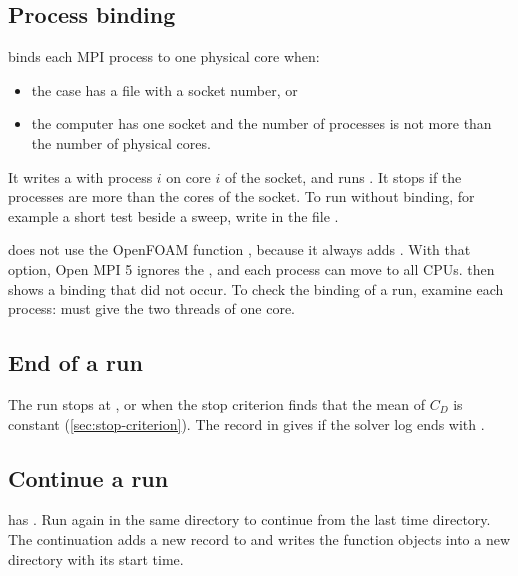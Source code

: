 \subsection{Process binding}\label{sec:binding}

 binds each MPI process to one physical core when:
\begin{itemize}
\item the case has a file  with a socket number, or
\item the computer has one socket and the number of processes is not more than the
  number of physical cores.
\end{itemize}

It writes a  with process $i$ on core $i$ of the socket, and runs
. It stops if the processes are more than the cores of the
socket. To run without binding, for example a short test beside a sweep, write
 in the file .

\begin{caution}
 does not use the OpenFOAM function , because it always
adds . With that option, Open MPI 5 ignores the
, and each process can move to all CPUs.  then shows a
binding that did not occur. To check the binding of a run, examine each process:
 must give the two threads of one core.
\end{caution}

\subsection{End of a run}

The run stops at , or when the stop criterion finds that the mean of
$C_D$ is constant (\cref{sec:stop-criterion}). The record in  gives
 if the solver log ends with .

\subsection{Continue a run}

 has . Run  again in the same
directory to continue from the last time directory. The continuation adds a new
record to  and writes the function objects into a new directory with
its start time.

